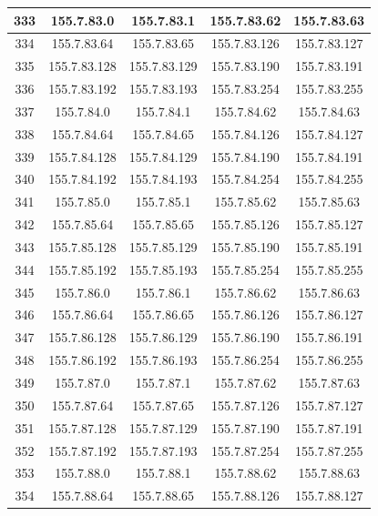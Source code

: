 \documentclass[letterpaper,12pt]{article}
\begin{document}
\begin{longtable}{|c|c|c|c|c|}
        333 & 155.7.83.0 & 155.7.83.1 & 155.7.83.62 & 155.7.83.63 \\ \hline
        334 & 155.7.83.64 & 155.7.83.65 & 155.7.83.126 & 155.7.83.127 \\ \hline
        335 & 155.7.83.128 & 155.7.83.129 & 155.7.83.190 & 155.7.83.191 \\ \hline
        336 & 155.7.83.192 & 155.7.83.193 & 155.7.83.254 & 155.7.83.255 \\ \hline
        337 & 155.7.84.0 & 155.7.84.1 & 155.7.84.62 & 155.7.84.63 \\ \hline
        338 & 155.7.84.64 & 155.7.84.65 & 155.7.84.126 & 155.7.84.127 \\ \hline
        339 & 155.7.84.128 & 155.7.84.129 & 155.7.84.190 & 155.7.84.191 \\ \hline
        340 & 155.7.84.192 & 155.7.84.193 & 155.7.84.254 & 155.7.84.255 \\ \hline
        341 & 155.7.85.0 & 155.7.85.1 & 155.7.85.62 & 155.7.85.63 \\ \hline
        342 & 155.7.85.64 & 155.7.85.65 & 155.7.85.126 & 155.7.85.127 \\ \hline
        343 & 155.7.85.128 & 155.7.85.129 & 155.7.85.190 & 155.7.85.191 \\ \hline
        344 & 155.7.85.192 & 155.7.85.193 & 155.7.85.254 & 155.7.85.255 \\ \hline
        345 & 155.7.86.0 & 155.7.86.1 & 155.7.86.62 & 155.7.86.63 \\ \hline
        346 & 155.7.86.64 & 155.7.86.65 & 155.7.86.126 & 155.7.86.127 \\ \hline
        347 & 155.7.86.128 & 155.7.86.129 & 155.7.86.190 & 155.7.86.191 \\ \hline
        348 & 155.7.86.192 & 155.7.86.193 & 155.7.86.254 & 155.7.86.255 \\ \hline
        349 & 155.7.87.0 & 155.7.87.1 & 155.7.87.62 & 155.7.87.63 \\ \hline
        350 & 155.7.87.64 & 155.7.87.65 & 155.7.87.126 & 155.7.87.127 \\ \hline
        351 & 155.7.87.128 & 155.7.87.129 & 155.7.87.190 & 155.7.87.191 \\ \hline
        352 & 155.7.87.192 & 155.7.87.193 & 155.7.87.254 & 155.7.87.255 \\ \hline
        353 & 155.7.88.0 & 155.7.88.1 & 155.7.88.62 & 155.7.88.63 \\ \hline
        354 & 155.7.88.64 & 155.7.88.65 & 155.7.88.126 & 155.7.88.127 \\ \hline

\end{longtable}
\end{document}
